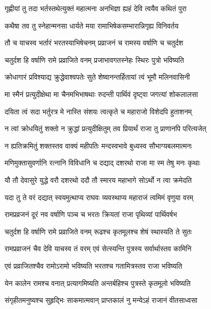 \twolineshloka
{गृह्णीयां तु तदा भर्तस्तथेत्युक्तं महात्मना}
{अनभिज्ञा ह्यहं देवि त्वयैव कथितं पुरा} %

\twolineshloka
{कथैषा तव तु स्नेहान्मनसा धार्यते मया}
{रामाभिषेकसम्भारान्निगृह्य विनिवर्तय} %

\twolineshloka
{तौ च याचस्व भर्तारं भरतस्याभिषेचनम्}
{प्रव्राजनं च रामस्य वर्षाणि च चतुर्दश} %

\twolineshloka
{चतुर्दश हि वर्षाणि रामे प्रव्राजिते वनम्}
{प्रजाभावगतस्नेहः स्थिरः पुत्रो भविष्यति} %

\twolineshloka
{क्रोधागारं प्रविश्याद्य क्रुद्धेवाश्वपतेः सुते}
{शेष्वानन्तर्हितायां त्वं भूमौ मलिनवासिनी} %

\twolineshloka
{मा स्मैनं प्रत्युदीक्षेथा मा चैनमभिभाषथाः}
{रुदन्ती पार्थिवं दृष्ट्वा जगत्यां शोकलालसा} %

\twolineshloka
{दयिता त्वं सदा भर्तुरत्र मे नास्ति संशयः}
{त्वत्कृते च महाराजो विशेदपि हुताशनम्} %

\twolineshloka
{न त्वां क्रोधयितुं शक्तो न क्रुद्धां प्रत्युदीक्षितुम्}
{तव प्रियार्थं राजा तु प्राणानपि परित्यजेत्} %

\twolineshloka
{न ह्यतिक्रमितुं शक्तस्तव वाक्यं महीपतिः}
{मन्दस्वभावे बुध्यस्व सौभाग्यबलमात्मनः} %

\twolineshloka
{मणिमुक्तासुवर्णानि रत्नानि विविधानि च}
{दद्याद् दशरथो राजा मा स्म तेषु मनः कृथाः} %

\twolineshloka
{यौ तौ देवासुरे युद्धे वरौ दशरथो ददौ}
{तौ स्मारय महाभागे सोऽर्थो न त्वा क्रमेदति} %

\twolineshloka
{यदा तु ते वरं दद्यात् स्वयमुत्थाप्य राघवः}
{व्यवस्थाप्य महाराजं त्वमिमं वृणुया वरम्} %

\twolineshloka
{रामप्रव्रजनं दूरं नव वर्षाणि पञ्च च}
{भरतः क्रियतां राजा पृथिव्यां पार्थिवर्षभ} %

\twolineshloka
{चतुर्दश हि वर्षाणि रामे प्रव्राजिते वनम्}
{रूढश्च कृतमूलश्च शेषं स्थास्यति ते सुतः} %

\twolineshloka
{रामप्रव्राजनं चैव देवि याचस्व तं वरम्}
{एवं सेत्स्यन्ति पुत्रस्य सर्वार्थास्तव कामिनि} %

\twolineshloka
{एवं प्रव्राजितश्चैव रामोऽरामो भविष्यति}
{भरतश्च गतामित्रस्तव राजा भविष्यति} %

\twolineshloka
{येन कालेन रामश्च वनात् प्रत्यागमिष्यति}
{अन्तर्बहिश्च पुत्रस्ते कृतमूलो भविष्यति} %

\twolineshloka
{संगृहीतमनुष्यश्च सुहृद्भिः साकमात्मवान्}
{प्राप्तकालं नु मन्येऽहं राजानं वीतसाध्वसा} %

